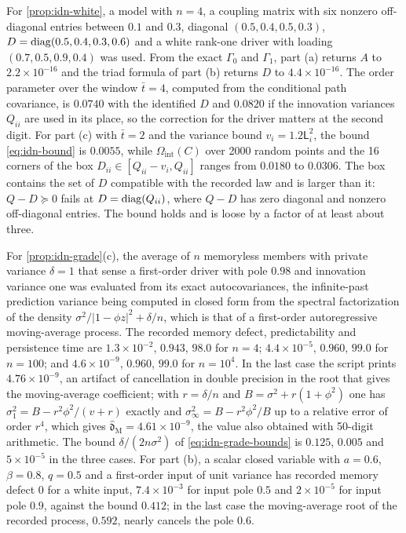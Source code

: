 \begin{numcheck}\label{chk:idn-bounds}
For \cref{prop:idn-white}, a model with $n=4$, a coupling matrix with six nonzero off-diagonal entries between $0.1$ and $0.3$, diagonal $(0.5,0.4,0.5,0.3)$, $D=\operatorname{diag}(0.5,0.4,0.3,0.6)$ and a white rank-one driver with loading $(0.7,0.5,0.9,0.4)$ was used. From the exact $\Gamma_0$ and $\Gamma_1$, part (a) returns $A$ to $2.2\times10^{-16}$ and the triad formula of part (b) returns $D$ to $4.4\times10^{-16}$. The order parameter over the window $\bar t=4$, computed from the conditional path covariance, is $0.0740$ with the identified $D$ and $0.0820$ if the innovation variances $Q_{ii}$ are used in its place, so the correction for the driver matters at the second digit. For part (c) with $\bar t=2$ and the variance bound $v_i=1.2\mathsf L_i^2$, the bound \cref{eq:idn-bound} is $0.0055$, while $\Omega_{\mathrm{int}}(C)$ over 2000 random points and the 16 corners of the box $D_{ii}\in[Q_{ii}-v_i,Q_{ii}]$ ranges from $0.0180$ to $0.0306$. The box contains the set of $D$ compatible with the recorded law and is larger than it: $Q-D\succeq0$ fails at $D=\operatorname{diag}(Q_{ii})$, where $Q-D$ has zero diagonal and nonzero off-diagonal entries. The bound holds and is loose by a factor of at least about three.
\end{numcheck}

\begin{numcheck}\label{chk:idn-grade}
For \cref{prop:idn-grade}(c), the average of $n$ memoryless members with private variance $\delta=1$ that sense a first-order driver with pole $0.98$ and innovation variance one was evaluated from its exact autocovariances, the infinite-past prediction variance being computed in closed form from the spectral factorization of the density $\sigma^2/|1-\phi z|^2+\delta/n$, which is that of a first-order autoregressive moving-average process. The recorded memory defect, predictability and persistence time are $1.3\times10^{-2}$, $0.943$, $98.0$ for $n=4$; $4.4\times10^{-5}$, $0.960$, $99.0$ for $n=100$; and $4.6\times10^{-9}$, $0.960$, $99.0$ for $n=10^4$. In the last case the script prints $4.76\times10^{-9}$, an artifact of cancellation in double precision in the root that gives the moving-average coefficient; with $r=\delta/n$ and $B=\sigma^2+r(1+\phi^2)$ one has $\sigma_1^2=B-r^2\phi^2/(v+r)$ exactly and $\sigma_\infty^2=B-r^2\phi^2/B$ up to a relative error of order $r^4$, which gives $\hat{\mathfrak d}_{\mathrm M}=4.61\times10^{-9}$, the value also obtained with 50-digit arithmetic. The bound $\delta/(2n\sigma^2)$ of \cref{eq:idn-grade-bounds} is $0.125$, $0.005$ and $5\times10^{-5}$ in the three cases. For part (b), a scalar closed variable with $a=0.6$, $\beta=0.8$, $q=0.5$ and a first-order input of unit variance has recorded memory defect $0$ for a white input, $7.4\times10^{-3}$ for input pole $0.5$ and $2\times10^{-5}$ for input pole $0.9$, against the bound $0.412$; in the last case the moving-average root of the recorded process, $0.592$, nearly cancels the pole $0.6$.
\end{numcheck}

